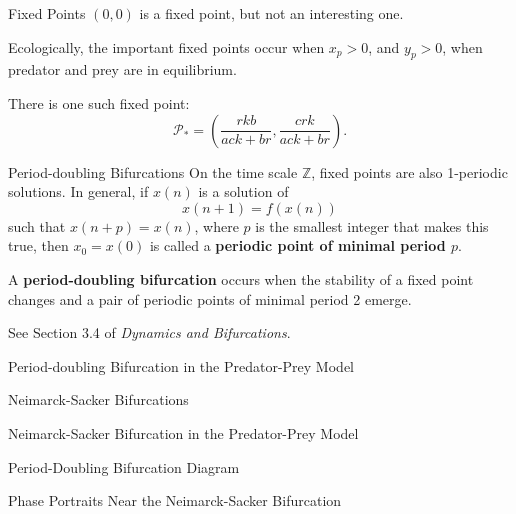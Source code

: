 \documentclass[]{beamer}
\begin{document}
	\begin{frame}{Fixed Points}
		$(0,0)$ is a fixed point, but not an interesting one.
		\vfill
		
		Ecologically, the important fixed points occur when $x_p > 0$, and $y_p > 0$, when predator and prey are in equilibrium.
		\vfill
		
		There is one such fixed point:
		\begin{equation*}
			\mathcal{P}_* = \left(\frac{rkb}{ack+br}, \frac{crk}{ack+br}\right).
		\end{equation*} 
	\end{frame}
	
	\begin{frame}{Period-doubling Bifurcations}
		On the time scale $\mathbb{Z}$, fixed points are also 1-periodic solutions. In general, if $x(n)$ is a solution of
		\begin{equation*}
			x(n+1) = f(x(n))
		\end{equation*}
		such that $x(n+p) = x(n)$, where $p$ is the smallest integer that makes this true, then $x_0 = x(0)$ is called a \textbf{periodic point of minimal period $p$}.
		\vfill
		
		A \textbf{period-doubling bifurcation} occurs when the stability of a fixed point changes and a pair of periodic points of minimal period 2 emerge.
		\vfill
		
		See Section 3.4 of \textit{Dynamics and Bifurcations}.
	\end{frame}
	
	\begin{frame}{Period-doubling Bifurcation in the Predator-Prey Model}
		
	\end{frame}
	
	\begin{frame}{Neimarck-Sacker Bifurcations}
		
	\end{frame}
	
	\begin{frame}{Neimarck-Sacker Bifurcation in the Predator-Prey Model}
		
	\end{frame}
	
	\begin{frame}{Period-Doubling Bifurcation Diagram}
		
	\end{frame}
	
	\begin{frame}{Phase Portraits Near the Neimarck-Sacker Bifurcation}
		
	\end{frame}
\end{document}
